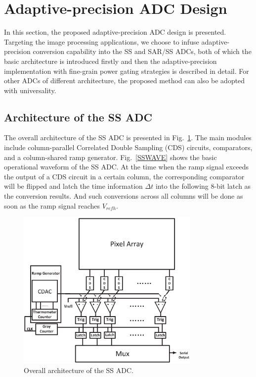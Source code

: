 \section{Adaptive-precision ADC Design}\label{architecture}

In this section, the proposed adaptive-precision ADC design is presented. Targeting the image processing applications, we choose to infuse adaptive-precision conversion capability into the SS and SAR/SS ADCs, both of which the basic architecture is introduced firstly and then the adaptive-precision implementation with fine-grain power gating strategies is described in detail. For other ADCs of different architecture, the proposed method can also be adopted with universality.

\subsection{Architecture of the SS ADC}

The overall architecture of the SS ADC is presented in Fig.~\ref{SSADC}. The main modules include column-parallel Correlated Double Sampling (CDS) circuits, comparators, 
and a column-shared ramp generator. Fig.~\ref{SSWAVE} shows the basic operational waveform of the SS ADC. At the time when the ramp signal exceeds the output of a CDS circuit in a certain column, 
the corresponding comparator will be flipped and latch the time information $\Delta t$ into the following 8-bit latch as the conversion results. 
And such conversions across all columns will be done as soon as the ramp signal reaches $V_{refh}$.

\begin{figure}[htbp]
	\centerline{\includegraphics[width=3.5in]{./Figures/SSADC.eps}}
	\caption{Overall architecture of the SS ADC.}
	\label{SSADC}
\end{figure} 

